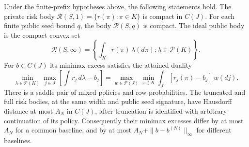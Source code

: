 \begin{theorem}
\label{thm:v12-infinite}
Under the finite-prefix hypotheses above, the following statements hold.
The private risk body $\mathcal R(S,1)=\{r(\pi):\pi\in K\}$ is compact
in $C(J)$. For each finite public seed bound $q$, the body
$\mathcal R(S,q)$ is compact. The ideal public body is the compact convex
set
\begin{equation}
 \mathcal R(S,\infty)
  =\left\{\int_K r(\pi)\,\lambda(d\pi):\lambda\in\mathcal P(K)\right\}.
 \label{eq:v12-bary}
\end{equation}
For $b\in C(J)$ its minimax excess satisfies the attained duality
\begin{equation}
 \min_{\lambda\in\mathcal P(K)}\max_{j\in J}
       \left[\int r_j\,d\lambda-b_j\right]
 =\max_{w\in\mathcal P(J)}\min_{\pi\in K}
       \int_J[r_j(\pi)-b_j]\,w(dj).
 \label{eq:v12-dual}
\end{equation}
There is a saddle pair of mixed policies and row probabilities.
The truncated and full risk bodies, at the same width and public seed
signature, have Hausdorff distance at most $A_N$ in $C(J)$, after
truncation is identified with arbitrary continuation of its policy.
Consequently their minimax excesses differ by at most $A_N$ for a common
baseline, and by at most $A_N+\|b-b^{(N)}\|_\infty$ for different baselines.
\end{theorem}

